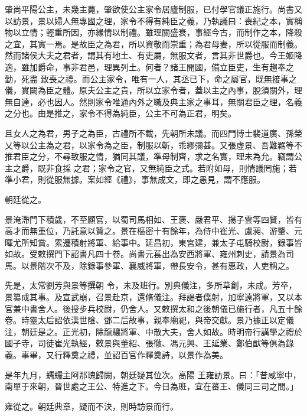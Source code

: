 \begin{pinyinscope}
 肇尚平陽公主，未幾主薨，肇欲使公主家令居廬制服，已付學官議正施行。尚書又以訪景，景以婦人無專國之理，家令不得有純臣之義，乃執議曰：喪紀之本，實稱物以立情；輕重所因，亦緣情以制禮。雖理關盛衰，事經今古，而制作之本，降殺之宜，其實一焉。是故臣之為君，所以資敬而崇重；為君母妻，所以從服而制義。然而諸侯大夫之君者，謂其有地土、有吏屬，無服文者，言其非世爵也。今王姬降適，雖加爵命，事非君邑，理異列土。何者？諸王開國，備立臣吏，生有趨奉之勤，死盡
 致喪之禮。而公主家令，唯有一人，其丞已下，命之屬官，既無接事之儀，實闕為臣之體。原夫公主之貴，所以立家令者，蓋以主之內事，脫須關外，理無自達，必也因人。然則家令唯通內外之職及典主家之事耳，無關君臣之理，名義之分也。由是推之，家令不得為純臣，公主不可為正君，明矣。



 且女人之為君，男子之為臣，古禮所不載，先朝所未議。而四門博士裴道廣、孫榮乂等以公主為之君，以家令為之臣，制服以斬，乖繆彌甚。又張虛景、吾難羈等不推君臣之分，不尋致服之情，猶同其議，準母制齊，求之名實，理未為允。竊謂公主之爵，既非食採
 之君；家令之官，又無純臣之式。若附如母，則情議罔施；若準小君，則從服無據。案如經《禮》，事無成文，即之愚見，謂不應服。



 朝廷從之。



 景淹滯門下積歲，不至顯官，以蜀司馬相如、王褒、嚴君平、揚子雲等四賢，皆有高才而無重位，乃託意以贊之。景在樞密十有餘年，為侍中崔光、盧昶、游肇、元暉尤所知賞。累遷積射將軍、給事中。延昌初，東宮建，兼太子屯騎校尉，錄事皆如故。受敕撰門下詔書凡四十卷。尚書元萇出為安西將軍、雍州刺史，請景為司馬。以景階次不及，除錄事參軍、襄威將軍，帶長安令，甚有惠政，人吏稱之。



 先是，太常劉芳與景等撰朝
 令，未及班行。別典儀注，多所草創，未成。芳卒，景纂成其事。及宣武崩，召景赴京，還脩儀注。拜謁者僕射，加寧遠將軍，又以本官兼中書舍人。後授步兵校尉，仍舍人。又敕撰太和之後朝儀已施行者，凡五十餘卷。時靈太后詔依漢世陰、鄧二后故事，親奉廟祀，與帝交獻。景乃據正以定儀注，朝廷是之。正光初，除龍驤將軍、中散大夫，舍人如故。時明帝行講學之禮於國子寺，司徒崔光執經，敕景與董紹、張徹、馮元興、王延業、鄭伯猷等俱為錄義。事畢，又行釋奠之禮，並詔百官作釋奠詩，以景作為美。



 是年九月，蠕蠕主阿那瑰歸闕，朝廷疑其位次。高陽
 王雍訪景。曰：「昔咸寧中，南單于來朝，晉世處之王公、特進之下。今日為班，宜在蕃王、儀同三司之間。」



 雍從之。朝廷典章，疑而不決，則時訪景而行。




\end{pinyinscope}
